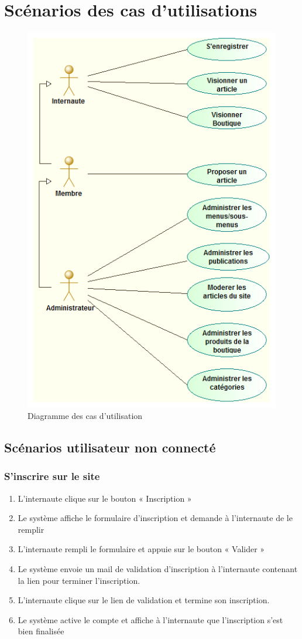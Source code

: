 \documentclass[a4paper,12pt, notitlepage]{report}
\begin{document}
\chapter{Scénarios des cas d'utilisations}
\begin{figure} 
    \caption{Diagramme des cas d'utilisation}  
    \label{use-case}
    \centering
    \includegraphics[scale=0.8]{images/diagUseCase.png}
\end{figure}
\section{Scénarios utilisateur non connecté}
\subsection{S'inscrire sur le site}
\begin{enumerate}
    \item L'internaute clique sur le bouton « Inscription » 
    \item Le système affiche le formulaire d'inscription et demande à l'internaute de le remplir 
    \item L'internaute rempli le formulaire et appuie sur le bouton « Valider » 
    \item Le système envoie un mail de validation d'inscription à l'internaute contenant la lien pour terminer l'inscription. 
    \item L'internaute clique sur le lien de validation et termine son inscription. 
    \item Le système active le compte et affiche à l'internaute que l'inscription s'est bien finalisée 
\end{enumerate}
\end{document}
